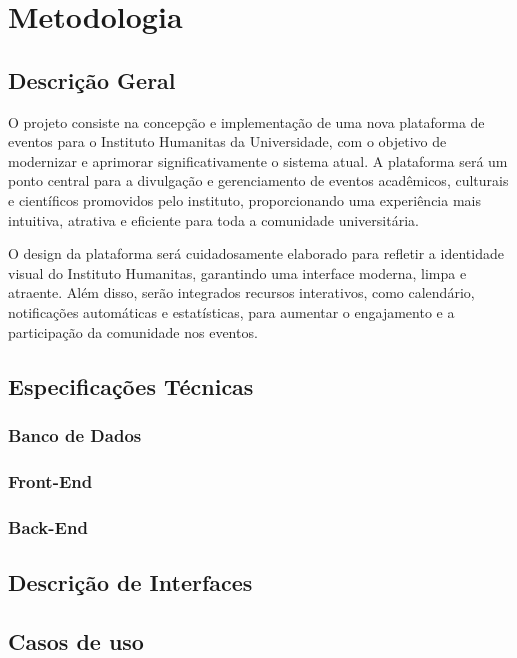 \chapter{Metodologia}


\section{Descrição Geral}

O projeto consiste na concepção e implementação de uma nova plataforma de eventos para o Instituto Humanitas da Universidade, com o objetivo de modernizar e aprimorar significativamente o sistema atual. A plataforma será um ponto central para a divulgação e gerenciamento de eventos acadêmicos, culturais e científicos promovidos pelo instituto, proporcionando uma experiência mais intuitiva, atrativa e eficiente para toda a comunidade universitária.

O design da plataforma será cuidadosamente elaborado para refletir a identidade visual do Instituto Humanitas, garantindo uma interface moderna, limpa e atraente. Além disso, serão integrados recursos interativos, como calendário, notificações automáticas e estatísticas, para aumentar o engajamento e a participação da comunidade nos eventos.


\section{Especificações Técnicas}

\subsection{Banco de Dados}


\subsection{Front-End}


\subsection{Back-End}


\section{Descrição de Interfaces}


\section{Casos de uso}


